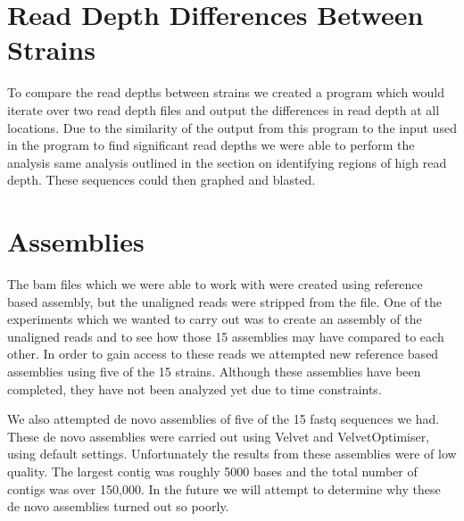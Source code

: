 \documentclass[12pt]{article}
\begin{document}
%
%
\vspace{-0.5cm}
\section{Read Depth Differences Between Strains}
\vspace{-0.5cm}
	To compare the read depths between strains we created a program which would iterate over two read depth files and output the differences in read depth at all locations. Due to the similarity of the output from this program to the input used in the program to find significant read depths we were able to perform the analysis same analysis outlined in the section on identifying regions of high read depth. These sequences could then graphed and blasted.

%
%
\vspace{-0.5cm}
\section{Assemblies}
\vspace{-0.5cm}
	The bam files which we were able to work with were created using reference based assembly, but the unaligned reads were stripped from the file. One of the experiments which we wanted to carry out was to create an assembly of the unaligned reads and to see how those 15 assemblies may have compared to each other. In order to gain access to these reads we attempted new reference based assemblies using five of the 15 strains. Although these assemblies have been completed, they have not been analyzed yet due to time constraints.

	We also attempted de novo assemblies of five of the 15 fastq sequences we had. These de novo assemblies were carried out using Velvet and VelvetOptimiser, using default settings. Unfortunately the results from these assemblies were of low quality. The largest contig was roughly 5000 bases and the total number of contigs was over 150,000. In the future we will attempt to determine why these de novo assemblies turned out so poorly.

%
%
\vspace{-0.5cm}
\end{document}
